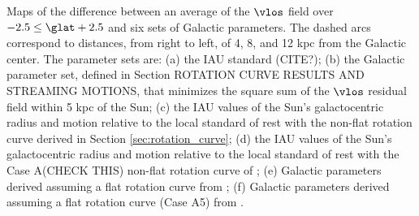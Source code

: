 Maps of the difference between an average of the $\vlos$ field over $-2.5 \leq \glat +2.5$ and six sets of Galactic parameters. The dashed arcs correspond to distances, from right to left, of 4, 8, and 12 kpc from the Galactic center. The parameter sets are: (a) the IAU standard (CITE?); (b) the Galactic parameter set, defined in Section ROTATION CURVE RESULTS AND STREAMING MOTIONS, that minimizes the square sum of the $\vlos$ residual field within 5 kpc of the Sun; (c) the IAU values of the Sun's galactocentric radius and motion relative to the local standard of rest with the non-flat rotation curve derived in Section \ref{sec:rotation_curve}; (d) the IAU values of the Sun's galactocentric radius and motion relative to the local standard of rest with the Case A(CHECK THIS) non-flat rotation curve of \citet{Clemens:1985dp}; (e) Galactic parameters derived assuming a flat rotation curve from \citet{Bovy_2012}; (f) Galactic parameters derived assuming a flat rotation curve (Case A5) from \citet{Reid:2014km}. 